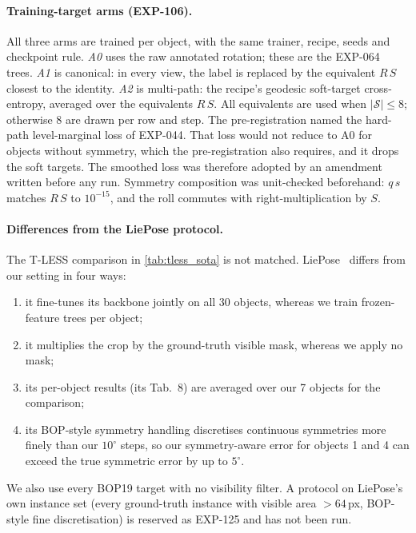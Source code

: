 \paragraph{Training-target arms (EXP-106).}
All three arms are trained per object, with the same trainer, recipe, seeds and checkpoint rule.
\emph{A0} uses the raw annotated rotation; these are the EXP-064 trees.
\emph{A1} is canonical: in every view, the label is replaced by the equivalent $R\,S$ closest to the identity.
\emph{A2} is multi-path: the recipe's geodesic soft-target cross-entropy, averaged over the equivalents $R\,S$. All equivalents are used when $|\mathcal{S}|\le8$; otherwise 8 are drawn per row and step.
The pre-registration named the hard-path level-marginal loss of EXP-044. That loss would not reduce to A0 for objects without symmetry, which the pre-registration also requires, and it drops the soft targets. The smoothed loss was therefore adopted by an amendment written before any run. Symmetry composition was unit-checked beforehand: $q\,s$ matches $R\,S$ to $10^{-15}$, and the roll commutes with right-multiplication by $S$.

\paragraph{Differences from the LiePose protocol.}
The T-LESS comparison in \cref{tab:tless_sota} is not matched. LiePose~\cite{hsiao2024liepose} differs from our setting in four ways:
\begin{enumerate}
  \item it fine-tunes its backbone jointly on all 30 objects, whereas we train frozen-feature trees per object;
  \item it multiplies the crop by the ground-truth visible mask, whereas we apply no mask;
  \item its per-object results (its Tab.~8) are averaged over our 7 objects for the comparison;
  \item its BOP-style symmetry handling discretises continuous symmetries more finely than our $10^\circ$ steps, so our symmetry-aware error for objects 1 and 4 can exceed the true symmetric error by up to $5^\circ$.
\end{enumerate}
We also use every BOP19 target with no visibility filter. A protocol on LiePose's own instance set (every ground-truth instance with visible area $>64$\,px, BOP-style fine discretisation) is reserved as EXP-125 and has not been run.

